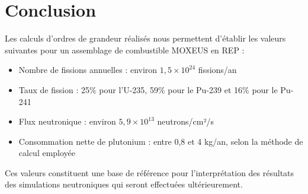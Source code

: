 \documentclass{article}
\begin{document}
\section{Conclusion}
Les calculs d'ordres de grandeur réalisés nous permettent d'établir les valeurs suivantes pour un assemblage de combustible MOXEUS en REP :
\begin{itemize}
  \item Nombre de fissions annuelles : environ $1,5 \times 10^{24}$ fissions/an
  \item Taux de fission : 25\% pour l'U-235, 59\% pour le Pu-239 et 16\% pour le Pu-241
  \item Flux neutronique : environ $5,9 \times 10^{13}$ neutrons/cm²/s
  \item Consommation nette de plutonium : entre 0,8 et 4 kg/an, selon la méthode de calcul employée
\end{itemize}
Ces valeurs constituent une base de référence pour l'interprétation des résultats des simulations neutroniques qui seront effectuées ultérieurement.
\end{document}
